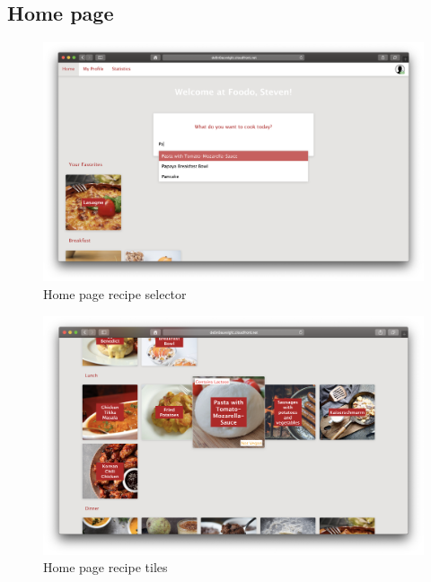 \subsection*{Home page}
\vspace{0.5em}
\begin{figure}[H]
	\captionsetup{justification=centering}
	\begin{center}
		\includegraphics[scale=0.30]{Ressourcen/img/screenshots/screenshotF.png}
		\vspace{-3em}
		\caption{Home page recipe selector }
		\label{fig:recipeSelector}
	\end{center}
\end{figure}
\vspace{-2em}
\begin{figure}[H]
	\captionsetup{justification=centering}
	\begin{center}
		\includegraphics[scale=0.30]{Ressourcen/img/screenshots/screenshotG.png}
		\vspace{-1em}
		\caption{Home page recipe tiles}
		\label{fig:recipeTiles}
	\end{center}
\end{figure}

